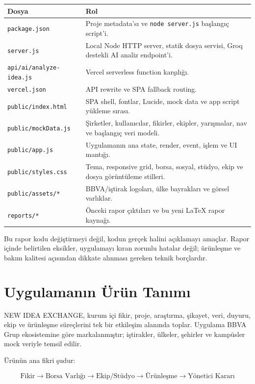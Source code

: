\documentclass[11pt,a4paper]{article}
\newcommand{\code}[1]{\texttt{#1}}
\begin{document}
\begin{longtable}{p{}p{}}
\toprule
\textbf{Dosya} & \textbf{Rol}\\
\midrule
\code{package.json} & Proje metadata'sı ve \code{node server.js} başlangıç script'i.\\
\code{server.js} & Local Node HTTP server, statik dosya servisi, Groq destekli AI analiz endpoint'i.\\
\code{api/ai/analyze-idea.js} & Vercel serverless function karşılığı.\\
\code{vercel.json} & API rewrite ve SPA fallback routing.\\
\code{public/index.html} & SPA shell, fontlar, Lucide, mock data ve app script yükleme sırası.\\
\code{public/mockData.js} & Şirketler, kullanıcılar, fikirler, ekipler, yarışmalar, nav ve başlangıç veri modeli.\\
\code{public/app.js} & Uygulamanın ana state, render, event, işlem ve UI mantığı.\\
\code{public/styles.css} & Tema, responsive grid, borsa, sosyal, stüdyo, ekip ve dosya görüntüleme stilleri.\\
\code{public/assets/*} & BBVA/iştirak logoları, ülke bayrakları ve görsel varlıklar.\\
\code{reports/*} & Önceki rapor çıktıları ve bu yeni LaTeX rapor kaynağı.\\
\bottomrule
\end{longtable}

Bu rapor kodu değiştirmeyi değil, kodun gerçek halini açıklamayı amaçlar. Rapor içinde belirtilen eksikler, uygulamayı kıran zorunlu hatalar değil; ürünleşme ve bakım kalitesi açısından dikkate alınması gereken teknik borçlardır.

\section{Uygulamanın Ürün Tanımı}

NEW IDEA EXCHANGE, kurum içi fikir, proje, araştırma, şikayet, veri, duyuru, ekip ve ürünleşme süreçlerini tek bir etkileşim alanında toplar. Uygulama BBVA Grup ekosistemine göre markalanmıştır; iştirakler, ülkeler, şehirler ve kampüsler mock veriyle temsil edilir.

Ürünün ana fikri şudur:

\[
\text{Fikir} \rightarrow \text{Borsa Varlığı} \rightarrow \text{Ekip/Stüdyo} \rightarrow \text{Ürünleşme} \rightarrow \text{Yönetici Kararı}
\]
\end{document}
